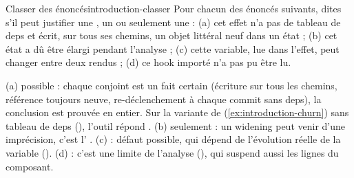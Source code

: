 \begin{exercice}{Classer des énoncés}{introduction-classer}
  Pour chacun des énoncés suivants, dites s'il peut justifier une \Error, un
  \Warning{} ou seulement une \Info{} : (a) \og cet effet n'a pas de
  tableau de deps et écrit, sur tous ses chemins, un objet littéral neuf dans
  un état\fg{} ; (b) \og cet état a dû être élargi pendant l'analyse\fg{} ;
  (c) \og cette variable, lue dans l'effet, peut changer entre deux
  rendus\fg{} ; (d) \og ce hook importé n'a pas pu être lu\fg{}.
\end{exercice}
\begin{solution}
  (a) \Error{} possible : chaque conjoint est un fait certain (écriture sur
  tous les chemins, référence toujours neuve, re-déclenchement à chaque
  commit sans deps), la conclusion est prouvée en entier. Sur la variante de
   (\cref{ex:introduction-churn}) sans tableau de deps
  (), l'outil répond . (b) \Info{} seulement : un
  widening peut venir d'une imprécision, c'est l'\Info{}
  . (c) \Warning{} : défaut possible, qui dépend de
  l'évolution réelle de la variable (). (d) \Info{} :
  c'est une limite de l'analyse (), qui suspend aussi
  les lignes  du composant.
\end{solution}


